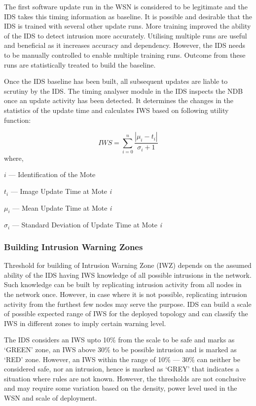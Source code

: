 \documentclass[conference,final]{IEEEtran}
\begin{document}
The first software update run in the WSN is considered to be legitimate and the IDS takes this timing information as baseline.
It is possible and desirable that the IDS is trained with several other update runs.
More training improved the ability of the IDS to detect intrusion more accurately.
Utilising multiple runs are useful and beneficial as it increases accuracy and dependency.
However, the IDS needs to be manually controlled to enable multiple training runs.
Outcome from these runs are statistically treated to build the baseline.


Once the IDS baseline has been built, all subsequent updates are liable to scrutiny by the IDS.
The timing analyser module in the IDS inspects the NDB once an update activity has been detected.
It determines the changes in the statistics of the update time and calculates IWS based on following utility function:

\begin{equation}
\label{eqn2} 
	\mathit{IWS} = \sum \limits_{i=0}^{n} \frac{\left| \mu_i - t_i \right|}{\sigma_i + 1}
	\end{equation}
where, 

	\hspace {.2cm} $i$ --- Identification of the Mote  
	
	\hspace {.2cm} $t_i$ --- Image Update Time at Mote \emph{i} 
	
	\hspace {.2cm} $\mu_i$ --- Mean Update Time at Mote \emph{i} 
	
	\hspace {.2cm} $\sigma_i$ --- Standard Deviation of Update Time at Mote \emph{i} 
	

\subsubsection{Building Intrusion Warning Zones}
\label{ssc:iw_zone}

Threshold for building of Intrusion Warning Zone (IWZ) depends on the assumed ability of the IDS having IWS knowledge of all possible intrusions in the network.
Such knowledge can be built by replicating intrusion activity from all nodes in the network once.
However, in case where it is not possible, replicating intrusion activity from the furthest few nodes may serve the purpose.
IDS can build a scale of possible expected range of IWS for the deployed topology and can classify the IWS in different zones to imply certain warning level.

The IDS considers an IWS upto 10\% from the scale to be safe and marks as `GREEN' zone, an IWS above 30\% to be possible intrusion and is marked as `RED' zone.
However, an IWS within the range of 10\% --- 30\% can neither be considered safe, nor an intrusion, hence is marked as `GREY' that indicates a situation where rules are not known.
However, the thresholds are not conclusive and may require some variation based on the density, power level used in the WSN and scale of deployment.
\end{document}
